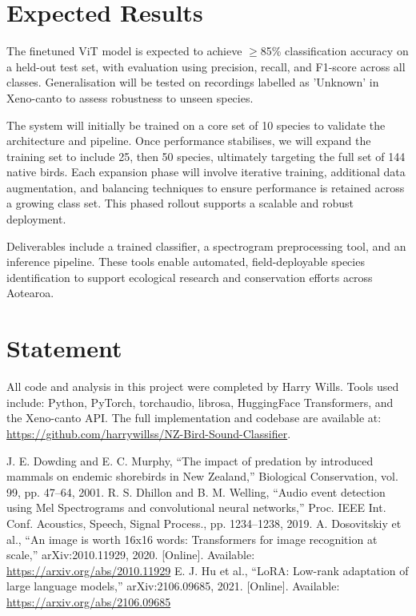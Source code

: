 \documentclass[conference,a4paper]{IEEEtran}
\begin{document}
\section{Expected Results}
The finetuned ViT model is expected to achieve $\geq$85\% classification accuracy on a held-out test set, with evaluation using precision, recall, and F1-score across all classes. Generalisation will be tested on recordings labelled as 'Unknown' in Xeno-canto to assess robustness to unseen species.

The system will initially be trained on a core set of 10 species to validate the architecture and pipeline. Once performance stabilises, we will expand the training set to include 25, then 50 species, ultimately targeting the full set of 144 native birds. Each expansion phase will involve iterative training, additional data augmentation, and balancing techniques to ensure performance is retained across a growing class set. This phased rollout supports a scalable and robust deployment.

Deliverables include a trained classifier, a spectrogram preprocessing tool, and an inference pipeline. These tools enable automated, field-deployable species identification to support ecological research and conservation efforts across Aotearoa.

\section{Statement}
All code and analysis in this project were completed by Harry Wills. Tools used include: Python, PyTorch, torchaudio, librosa, HuggingFace Transformers, and the Xeno-canto API. 
The full implementation and codebase are available at: \url{https://github.com/harrywillss/NZ-Bird-Sound-Classifier}.

\begin{thebibliography}{00}
 J. E. Dowding and E. C. Murphy, ``The impact of predation by introduced mammals on endemic shorebirds in New Zealand,'' Biological Conservation, vol. 99, pp. 47--64, 2001.
 R. S. Dhillon and B. M. Welling, ``Audio event detection using Mel Spectrograms and convolutional neural networks,'' Proc. IEEE Int. Conf. Acoustics, Speech, Signal Process., pp. 1234--1238, 2019.
 A. Dosovitskiy et al., ``An image is worth 16x16 words: Transformers for image recognition at scale,'' arXiv:2010.11929, 2020. [Online]. Available: \url{https://arxiv.org/abs/2010.11929}
 E. J. Hu et al., ``LoRA: Low-rank adaptation of large language models,'' arXiv:2106.09685, 2021. [Online]. Available: \url{https://arxiv.org/abs/2106.09685}
\end{thebibliography}
\end{document}
